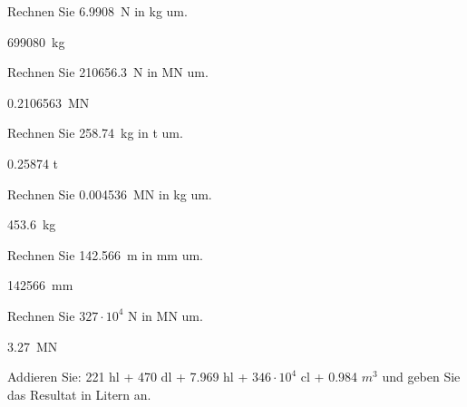 \begin{questions}
\question[1]
Rechnen Sie \SI{6.9908}{\N} in \si{kg} um.

\begin{solutionorbox}[3cm]
\SI{699080}{\kilogram}
\end{solutionorbox}



\question[1]
Rechnen Sie \SI{210656.3}{\N} in \si{\mega\N} um.
\vspace*{0.1cm}

\begin{solutionorbox}[3cm]
\SI{0.2106563}{\mega\N}
\end{solutionorbox}



\question[1]
Rechnen Sie \SI{258.74}{\kilogram} in t um.
\vspace*{0.1cm}

\begin{solutionorbox}[3cm]
0.25874 t
\end{solutionorbox}


\question[1]
Rechnen Sie \SI{0.004536}{\mega\N} in \si{kg} um.
\vspace*{0.1cm}

\begin{solutionorbox}[3cm]
\SI{453.6}{\kilogram}
\end{solutionorbox}

\question[1]
Rechnen Sie \SI{142.566}{\m} in \si{\mm} um.
\vspace*{0.1cm}

\begin{solutionorbox}[3cm]
\SI{142566}{\mm}
\end{solutionorbox}

\ifprintanswers
\clearpage
\else
{}
\fi

\question[1]
Rechnen Sie $327\cdot 10^4$ N in \si{\mega\N} um.
\vspace*{0.1cm}

\begin{solutionorbox}[3cm]
\SI{3.27}{\mega\N}
\end{solutionorbox}



\question[5]
Addieren Sie: 221 hl + 470 dl + 7.969 hl + $346 \cdot 10^4$ cl + 0.984 $m^3$ und geben Sie das Resultat in Litern an.
\vspace*{0.1cm}


\end{questions}
